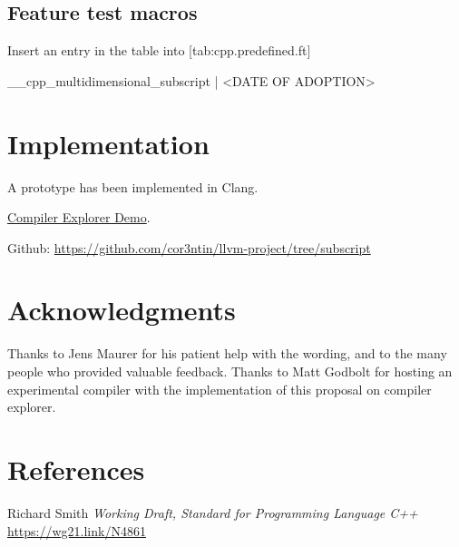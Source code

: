 \documentclass{wg21}
\begin{document}
\subsection{Feature test macros}

Insert an entry in the table into [tab:cpp.predefined.ft]

\begin{addedblock}
\begin{codeblock}
__cpp_multidimensional_subscript | <DATE OF ADOPTION>
\end{codeblock}
\end{addedblock}

\section{Implementation}

A prototype has been implemented in Clang.

\href{https://gcc.godbolt.org/z/4szfLo}{Compiler Explorer Demo}.

Github: \url{https://github.com/cor3ntin/llvm-project/tree/subscript}

\section{Acknowledgments}

Thanks to Jens Maurer for his patient help with the wording, and to the many people who provided valuable feedback.
Thanks to Matt Godbolt for hosting an experimental compiler with the implementation
of this proposal on compiler explorer.

\section{References}
\renewcommand{\section}[2]{}%



\begin{thebibliography}{9}

    Richard Smith
    \emph{Working Draft, Standard for Programming Language C++}\newline
    \url{https://wg21.link/N4861}

\end{thebibliography}
\end{document}
